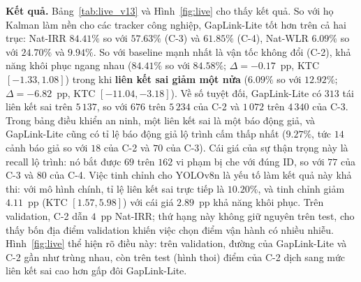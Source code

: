 \textbf{Kết quả.} Bảng~\ref{tab:live_v13} và Hình~\ref{fig:live} cho thấy kết quả. So với họ Kalman làm nền cho các tracker công nghiệp, GapLink-Lite tốt hơn trên cả hai trục: Nat-IRR $\mathbf{84.41\%}$ so với $57.63\%$ (C-3) và $61.85\%$ (C-4), Nat-WLR $\mathbf{6.09\%}$ so với $24.70\%$ và $9.94\%$. So với baseline mạnh nhất là vận tốc không đổi (C-2), khả năng khôi phục ngang nhau ($84.41\%$ so với $84.58\%$; $\Delta = -0.17$~pp, KTC $[-1.33, 1.08]$) trong khi \textbf{liên kết sai giảm một nửa} ($6.09\%$ so với $12.92\%$; $\Delta = -6.82$~pp, KTC $[-11.04, -3.18]$). Về số tuyệt đối, GapLink-Lite có $313$ tái liên kết sai trên $5\,137$, so với $676$ trên $5\,234$ của C-2 và $1\,072$ trên $4\,340$ của C-3. Trong bảng điều khiển an ninh, một liên kết sai là một báo động giả, và GapLink-Lite cũng có tỉ lệ báo động giả lộ trình cấm thấp nhất ($9.27\%$, tức $14$ cảnh báo giả so với $18$ của C-2 và $70$ của C-3). Cái giá của sự thận trọng này là recall lộ trình: nó bắt được $69$ trên $162$ vi phạm bị che với đúng ID, so với $77$ của C-3 và $80$ của C-4. Việc tinh chỉnh cho YOLOv8n là yếu tố làm kết quả này khả thi: với mô hình chính, tỉ lệ liên kết sai trực tiếp là $10.20\%$, và tinh chỉnh giảm $4.11$~pp (KTC $[1.57, 5.98]$) với cái giá $2.89$~pp khả năng khôi phục. Trên validation, C-2 dẫn $4$~pp Nat-IRR; thứ hạng này không giữ nguyên trên test, cho thấy bốn địa điểm validation khiến việc chọn điểm vận hành có nhiều nhiễu. Hình~\ref{fig:live} thể hiện rõ điều này: trên validation, đường của GapLink-Lite và C-2 gần như trùng nhau, còn trên test (hình thoi) điểm của C-2 dịch sang mức liên kết sai cao hơn gấp đôi GapLink-Lite.


